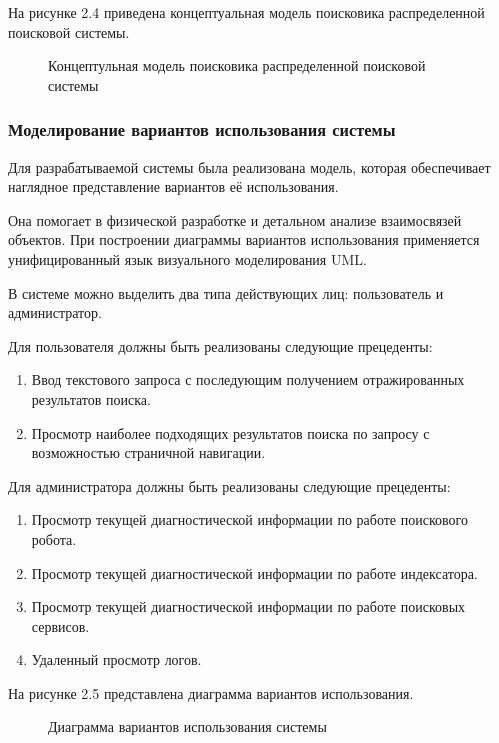 На рисунке 2.4 приведена концептуальная модель поисковика распределенной поисковой системы.

\begin{figure}[H]
\caption{Концептульная модель поисковика распределенной поисковой системы}
\label{concept_searcher_model:image}
\end{figure}

\subsubsection{Моделирование вариантов использования системы}

Для разрабатываемой системы была реализована модель, которая обеспечивает наглядное представление вариантов её использования.

Она помогает в физической разработке и детальном анализе взаимосвязей объектов. При построении диаграммы вариантов использования применяется унифицированный язык визуального моделирования UML.

В системе можно выделить два типа действующих лиц: пользователь и администратор. 

Для пользователя должны быть реализованы следующие прецеденты:
\begin{enumerate}
\item Ввод текстового запроса с последующим получением отражированных результатов поиска.
\item Просмотр наиболее подходящих результатов поиска по запросу с возможностью страничной навигации.
\end{enumerate}

Для администратора должны быть реализованы следующие прецеденты:
\begin{enumerate}
\item Просмотр текущей диагностической информации по работе поискового робота.
\item Просмотр текущей диагностической информации по работе индексатора.
\item Просмотр текущей диагностической информации по работе  поисковых сервисов.
\item Удаленный просмотр логов.
\end{enumerate}

На рисунке 2.5 представлена диаграмма вариантов использования.

\begin{figure}[H]
\caption{Диаграмма вариантов использования системы}
\label{diagram_usecases:image}
\end{figure}


